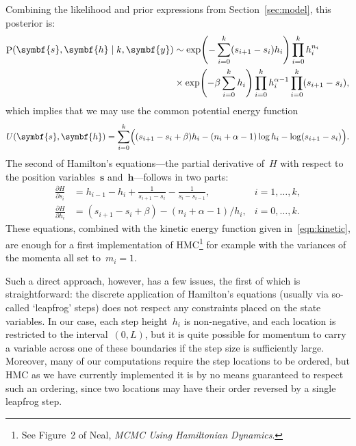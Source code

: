 \documentclass[11pt,a4paper]{article}
\newcommand\ub[1]{\symbf{#1}}                    %
\DeclareMathOperator\Pb{P}                       %
\DeclarePairedDelimiter\lr{\lparen}{\rparen}     %
\theoremstyle{definition}
\begin{document}
Combining the likelihood and prior expressions from Section~\ref{sec:model},
this posterior is:
\begin{align*}
  \Pb(\ub{s},\ub{h} \mid k,\ub{y}) &\sim
    \exp\lr*{-\sum_{i=0}^k (s_{i+1} - s_i)h_i} \prod_{i=0}^k h_i^{n_i} \\
  &\times \exp\lr*{-\beta \sum_{i=0}^k h_i} \prod_{i=0}^k h_i^{\alpha-1}
    \prod_{i=0}^k (s_{i+1} - s_i),
\end{align*}
which implies that we may use the common potential energy function
\[ U(\ub{s},\ub{h}) = \sum_{i=0}^k \lr[\Big]{(s_{i+1} - s_i + \beta)h_i
    - (n_i+\alpha-1)\log h_i - \log(s_{i+1} - s_i)}. \]
The second of Hamilton's equations---the partial derivative of~$H$ with respect
to the position variables~$\ub{s}$ and~$\ub{h}$---follows in two parts:
\begin{align*}
  \frac{\partial H}{\partial s_i} &= h_{i-1} - h_i + \frac{1}{s_{i+1} - s_i}
    - \frac{1}{s_i - s_{i-1}}, &i = 1,\dots,k, \\
  \frac{\partial H}{\partial h_i} &= (s_{i+1} - s_i + \beta)
    - (n_i+\alpha-1)/h_i, &i = 0,\dots,k.
\end{align*}
These equations, combined with the kinetic energy function given
in~\eqref{eqn:kinetic}, are enough for a first implementation of
HMC\footnote{See Figure~2 of Neal, \textit{MCMC Using Hamiltonian Dynamics}.}
for example with the variances of the momenta all set to~$m_i = 1$.

Such a direct approach, however, has a few issues, the first of which is
straightforward: the discrete application of Hamilton's equations (usually via
so-called `leapfrog' steps) does not respect any constraints placed on the state
variables. In our case, each step height~$h_i$ is non-negative, and each
location is restricted to the interval~$(0,L)$, but it is quite possible for
momentum to carry a variable across one of these boundaries if the step size is
sufficiently large. Moreover, many of our computations require the step
locations to be ordered, but HMC as we have currently implemented it is by no
means guaranteed to respect such an ordering, since two locations may have their
order reversed by a single leapfrog step.
\end{document}

